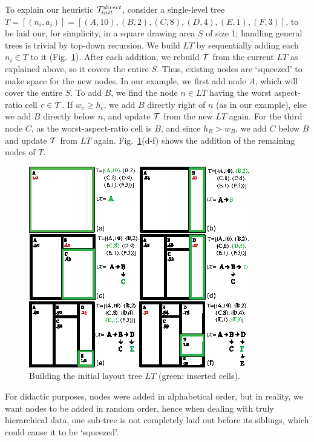 To explain our heuristic ${\cal T}_{init}^{direct}$, consider a single-level tree $T = [(n_i,a_i)]  =  [ (A, 10), (B, 2), (C, 8), (D, 4), (E, 1), (F, 3) ]$, to be laid our, for simplicity, in a square drawing area $S$ of size 1; handling general trees is trivial by top-down recursion. We build $LT$ by sequentially adding each $n_i \in T$ to it (Fig.~\ref{fig:git_example}). After each addition, we rebuild ${\cal T}$ from the current $LT$ as explained above, so it covers the entire $S$. Thus, existing nodes are `squeezed' to make space for the new nodes. In our example, we first add node $A$, which will cover the entire $S$. To add $B$, we find the node $n \in LT$ having the worst aspect-ratio cell $c \in {\cal T}$. If $w_c \geq h_c$, we add $B$ directly right of $n$ (as in our example), else we add $B$ directly below $n$, and update ${\cal T}$ from the new $LT$ again. For the third node $C$, as the worst-aspect-ratio cell is $B$, and since $h_B > w_B$, we add $C$ below $B$ and update ${\cal T}$ from $LT$ again. Fig.~\ref{fig:git_example}(d-f) shows the addition of the remaining nodes of $T$.\\

\begin{figure}[htbp!]
\centering
\includegraphics[width=.8\textwidth]{figures/treemap-algorithm/git_example.eps}
\caption{Building the initial layout tree $LT$ (green: inserted cells).}
\label{fig:git_example}
\end{figure}

For didactic purposes, nodes were added in alphabetical order, but in reality, we want nodes to be added in random order, hence when dealing with truly hierarchical data, one sub-tree is not completely laid out before its siblings, which could cause it to be `squeezed'.

